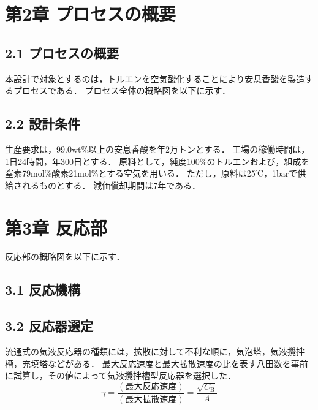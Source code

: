 \documentclass[a4j, titlepage]{jsarticle}
\begin{document}
\newpage
\section*{第2章 プロセスの概要}
\subsection*{2.1 プロセスの概要}
本設計で対象とするのは，トルエンを空気酸化することにより安息香酸を製造するプロセスである．
プロセス全体の概略図を以下に示す．

\subsection*{2.2 設計条件}
生産要求は，99.0wt\%以上の安息香酸を年2万トンとする．
工場の稼働時間は，1日24時間，年300日とする．
原料として，純度100\%のトルエンおよび，組成を窒素79mol\%酸素21mol\%とする空気を用いる．
ただし，原料は25℃，1barで供給されるものとする．
減価償却期間は7年である．

\newpage
\section*{第3章 反応部}
反応部の概略図を以下に示す．

\subsection*{3.1 反応機構}

\subsection*{3.2 反応器選定}
流通式の気液反応器の種類には，拡散に対して不利な順に，気泡塔，気液攪拌槽，充填塔などがある．
最大反応速度と最大拡散速度の比を表す八田数を事前に試算し，その値によって気液攪拌槽型反応器を選択した．
\begin{equation}
    \gamma = \frac{(最大反応速度)}{(最大拡散速度)} = \frac{\sqrt{C_{{\mathrm B}}}}{A}
\end{equation}
\end{document}
